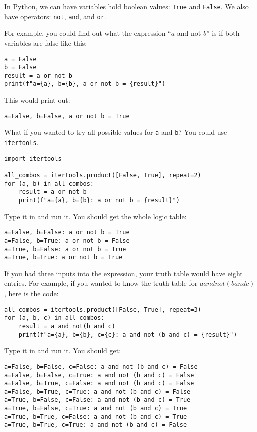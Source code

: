 In Python, we can have variables hold boolean values: \texttt{True}
and \texttt{False}.  We also have operators: \texttt{not},
\texttt{and}, and \texttt{or}.

For example, you could find out what the expression ``$a$ and not
$b$'' is if both variables are false like this:
\begin{verbatim}
a = False
b = False
result = a or not b
print(f"a={a}, b={b}, a or not b = {result}")
\end{verbatim}

This would print out:
\begin{verbatim}
a=False, b=False, a or not b = True
\end{verbatim}

What if you wanted to try all possible values for \texttt{a} and
\texttt{b}? You could use \texttt{itertools}.

\begin{verbatim}
import itertools

all_combos = itertools.product([False, True], repeat=2)
for (a, b) in all_combos:
    result = a or not b
    print(f"a={a}, b={b}: a or not b = {result}")       
\end{verbatim}

Type it in and run it. You should get the whole logic table:

\begin{verbatim}
a=False, b=False: a or not b = True
a=False, b=True: a or not b = False
a=True, b=False: a or not b = True
a=True, b=True: a or not b = True
\end{verbatim}

If you had three inputs into the expression, your truth table would
have eight entries.  For example, if you wanted to know the truth
table for $a and not(b and c)$, here is the code:

\begin{verbatim}
all_combos = itertools.product([False, True], repeat=3)
for (a, b, c) in all_combos:
    result = a and not(b and c)
    print(f"a={a}, b={b}, c={c}: a and not (b and c) = {result}")
\end{verbatim}

Type it in and run it. You should get:

\begin{verbatim}
a=False, b=False, c=False: a and not (b and c) = False
a=False, b=False, c=True: a and not (b and c) = False
a=False, b=True, c=False: a and not (b and c) = False
a=False, b=True, c=True: a and not (b and c) = False
a=True, b=False, c=False: a and not (b and c) = True
a=True, b=False, c=True: a and not (b and c) = True
a=True, b=True, c=False: a and not (b and c) = True
a=True, b=True, c=True: a and not (b and c) = False
\end{verbatim}

